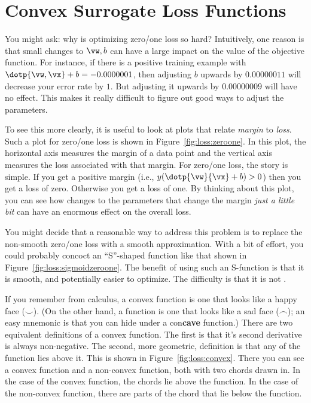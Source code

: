 \section{Convex Surrogate Loss Functions}

You might ask: why is optimizing zero/one loss so hard?  Intuitively,
one reason is that small changes to $\vw,b$ can have a large impact on
the value of the objective function.  For instance, if there is a
positive training example with $\dotp{\vw,\vx}+b = -0.0000001$, then
adjusting $b$ upwards by $0.00000011$ will decrease your error rate by
$1$.  But adjusting it upwards by $0.00000009$ will have no effect.
This makes it really difficult to figure out good ways to adjust the
parameters.


To see this more clearly, it is useful to look at plots that relate
\emph{margin} to \emph{loss}.  Such a plot for zero/one loss is shown
in Figure~\ref{fig:loss:zeroone}.  In this plot, the horizontal axis
measures the margin of a data point and the vertical axis measures the
loss associated with that margin.  For zero/one loss, the story is
simple.  If you get a positive margin (i.e., $y(\dotp{\vw}{\vx}+b)>0$)
then you get a loss of zero.  Otherwise you get a loss of one.  By
thinking about this plot, you can see how changes to the parameters
that change the margin \emph{just a little bit} can have an enormous
effect on the overall loss.


You might decide that a reasonable way to address this problem is to
replace the non-smooth zero/one loss with a smooth approximation.
With a bit of effort, you could probably concoct an ``S''-shaped
function like that shown in Figure~\ref{fig:loss:sigmoidzeroone}.  The
benefit of using such an S-function is that it is smooth, and
potentially easier to optimize.  The difficulty is that it is not
.

If you remember from calculus, a convex function is one that looks
like a happy face ($\smile$).  (On the other hand, a 
function is one that looks like a sad face ($\frown$); an easy
mnemonic is that you can hide under a con{\bf cave} function.)  There
are two equivalent definitions of a convex function.  The first is
that it's second derivative is always non-negative.  The second, more
geometric, definition is that any  of the function lies
above it.  This is shown in Figure~\ref{fig:loss:convex}.  There you
can see a convex function and a non-convex function, both with two
chords drawn in.  In the case of the convex function, the chords lie
above the function.  In the case of the non-convex function, there are
parts of the chord that lie below the function.


